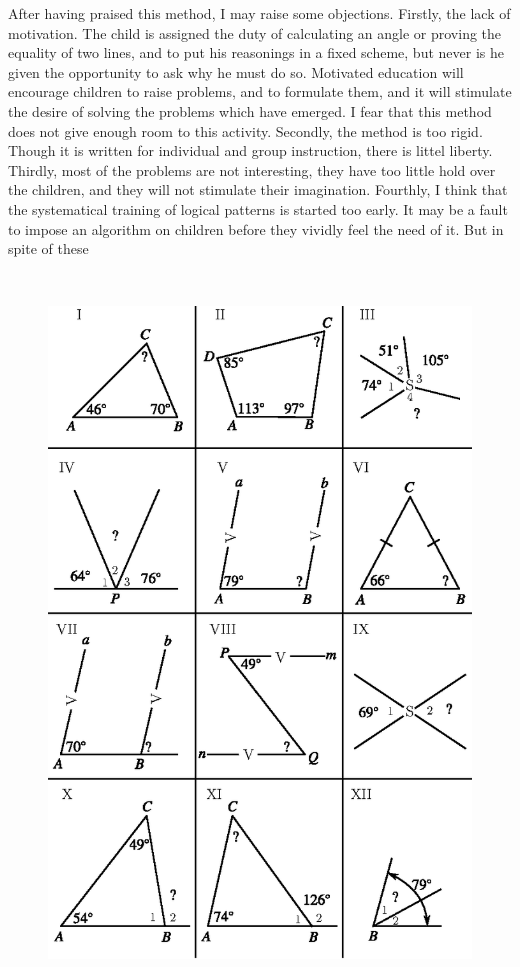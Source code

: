 {\parfillskip=0pt After having praised this method, I may raise some objections. Firstly, the lack of motivation. The child is assigned the duty of calculating an angle or proving the equality of two lines, and to put his reasonings in a fixed scheme, but never is he given the opportunity to ask why he must do so. Motivated education will encourage children to raise problems, and to formulate them, and it will stimulate the desire of solving the problems which have emerged. I fear that this method does not give enough room to this activity. Secondly, the method is too rigid. Though it is written for individual and group instruction, there is littel liberty. Thirdly, most of the problems are not interesting, they have too little hold over the children, and they will not stimulate their imagination. Fourthly, I think that the systematical training of logical patterns is started too early. It may be a fault to impose an algorithm on children before they vividly feel the need of it. But in spite of these \par}

\newpage

~\phantom{a}
\vfill

\begin{figure}[H]
\centering
\includegraphics[scale=.95]{figure/fig_01.eps}
\caption{}\label{chap6-fig1}
\end{figure}
\vfill\eject

